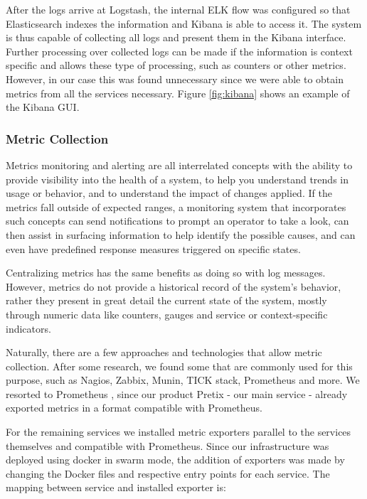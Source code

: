 \documentclass[12pt]{article}
\begin{document}
After the logs arrive at Logstash, the internal ELK flow was configured so that Elasticsearch indexes the information and Kibana is able to access it.
The system is thus capable of collecting all logs and present them in the Kibana interface.
Further processing over collected logs can be made if the information is context specific and allows these type of processing, such as counters or other metrics.
However, in our case this was found unnecessary since we were able to obtain metrics from all the services necessary.
Figure \ref{fig:kibana} shows an example of the Kibana GUI.

\subsubsection{Metric Collection}

Metrics monitoring and alerting are all interrelated concepts with the ability to provide visibility into the health of a system, to help you understand trends
in usage or behavior, and to understand the impact of changes applied.
If the metrics fall outside of expected ranges, a monitoring system that incorporates such concepts can send notifications to prompt an operator to take a look,
can then assist in surfacing information to help identify the possible causes, and can even have predefined response measures triggered on specific states.

Centralizing metrics has the same benefits as doing so with log messages.
However, metrics do not provide a historical record of the system's behavior, rather they present in great detail the current state of the system, mostly through
numeric data like counters, gauges and service or context-specific indicators.

Naturally, there are a few approaches and technologies that allow metric collection.
After some research, we found some that are commonly used for this purpose, such as Nagios, Zabbix, Munin, TICK stack, Prometheus and more.
We resorted to Prometheus \cite{prometheus}, since our product Pretix - our main service - already exported metrics in a format compatible with Prometheus.

For the remaining services we installed metric exporters parallel to the services themselves and compatible with Prometheus.
Since our infrastructure was deployed using docker in swarm mode, the addition of exporters was made by changing the Docker files and respective entry points
for each service.
The mapping between service and installed exporter is:
\end{document}
